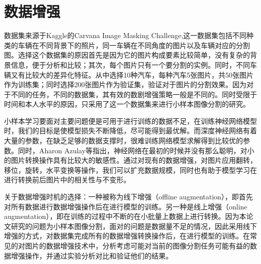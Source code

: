 \documentclass[AutoFakeBold]{LZUThesis}
\begin{document}
\section{数据增强}
数据集来源于Kaggle的Carvana Image Masking Challenge,这一数据集包括不同种类的车辆在不同背景下的照片，同一车辆在不同角度的图片以及车辆对应的分割图。选择这个数据集的原因首先是因为它的图片构成要素比较简单，没有复杂的背景信息，便于分析和比较；其次，每个图片只有一个要分割的实例。同时，不同车辆又有比较大的差异化特征。从中选择10种汽车，每种汽车5张图片，共50张图片作为训练集；同时选择200张图片作为验证集，验证对于图片的分割效果。因为对于不同的任务，不同的数据集，其有效的数剧增强策略一般是不同的。同时受限于时间和本人水平的原因，只采用了这一个数据集来进行小样本图像分割的研究。

小样本学习要面对主要问题便是可用于进行训练的数据不足，在训练神经网络模型时，我们的目标是使模型损失不断降低，尽可能得到最优解。而深度神经网络有着大量的参数，在缺乏足够的数据支撑时，很难训练网络模型求解得到比较优的参数。同时，Aharon Azulay等\textsuperscript{\cite{Azulay2019WhyDD}}指出，神经网络在最初的时候并没有那么聪明，对小的图片转换操作具有比较大的敏感性。通过对现有的数据增强，对图片应用翻转，移位，旋转，水平变换等操作，我们可以扩充数据规模，同时也有助于模型学习在进行转换前后图片中的相关性与不变形。

关于数据增强时机的选择：一种被称为线下增强（offline augmentation），即首先对所有数据进行数据增强操作后在进行模型的训练。另一种是线上增强（online augmentation）\textsuperscript{\cite{tang2020onlineaugment}}，即在训练的过程中不断的在小批量上数据上进行转换。因为本论文研究的问题为小样本图像分割，面对的问题是数据量不足的情况，因此采用线下增强的方式，对数据集完成所有的数据增强转换操作后，在进行模型的训练。在常见的对图片的数据增强技术中，分析考虑可能对当前的图像分割任务可能有益的数据增强操作，并通过实验分析对比和验证他们的结果。
\end{document}
